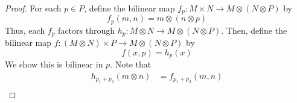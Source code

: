 \begin{proof}
    For each \( p \in P \), define the bilinear map \( f_p : M \times N \to M \otimes (N \otimes P) \) by
    \[ f_p(m, n) = m \otimes (n \otimes p) \]
    Thus, each \( f_p \) factors through \( h_p : M \otimes N \to M \otimes (N \otimes P) \).
    Then, define the bilinear map \( f : (M \otimes N) \times P \to M \otimes (N \otimes P) \) by
    \[ f(x, p) = h_p(x) \]
    We show this is bilinear in \( p \).
    Note that
    \begin{align*}
        h_{p_1 + p_2}(m \otimes n) &= f_{p_1 + p_2}(m, n) \\

\end{align*}
\end{proof}
